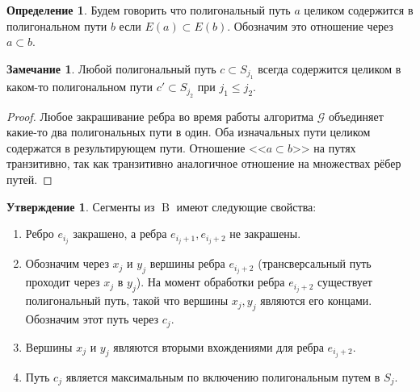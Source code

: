 \documentclass{article}
\theoremstyle{definition}
\newtheorem{conjecture}[theorem]{Утверждение}
\newtheorem{definition}[theorem]{Определение}
\newtheorem{remark}[theorem]{Замечание}
\newcommand{\G}{\mathcal{G}}
\newcommand{\B}{\operatorname{B}}
\begin{document}
\begin{definition}
    Будем говорить что полигональный путь $a$ целиком содержится в полигональном пути $b$ если $E(a) \subset E(b)$. Обозначим это отношение через $a \subset b$.
\end{definition}

\begin{remark}\label{remark:c-subset}
    Любой полигональный путь $c \subset S_{j_1}$ всегда содержится целиком в каком-то полигональном пути $c' \subset S_{j_2}$ при $j_1 \leq j_2$.
\end{remark}

\begin{proof}
    Любое закрашивание ребра во время работы алгоритма $\G$ объединяет какие-то два полигональных пути в один. Оба изначальных пути целиком содержатся в результирующем пути. Отношение <<$a \subset b$>> на путях транзитивно, так как транзитивно аналогичное отношение на множествах рёбер путей.
\end{proof}

\begin{conjecture}\label{conj:B-properties}
    Сегменты из $\B$ имеют следующие свойства:
    \begin{enumerate}
        \item Ребро $e_{i_j}$ закрашено, а ребра $e_{i_j + 1}, e_{i_j + 2}$ не закрашены.
        \item Обозначим через $x_j$ и $y_j$ вершины ребра $e_{i_j + 2}$ (трансверсальный путь проходит через $x_j$ в $y_j$). На момент обработки ребра $e_{i_j + 2}$ существует полигональный путь, такой что вершины $x_j, y_j$ являются его концами. Обозначим этот путь через $c_j$.
        \item Вершины $x_j$ и $y_j$ являются вторыми вхождениями для ребра $e_{i_j + 2}$.
        \item Путь $c_j$ является максимальным по включению полигональным путем в $S_j$.
    \end{enumerate}    
\end{conjecture}
\end{document}
